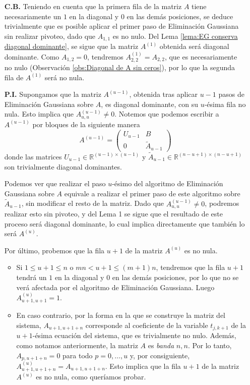             \begin{itemize}
                \item[\textbf{C.B.}] Teniendo en cuenta que la primera fila de la matriz $A$ tiene necesariamente un $1$ en la diagonal y $0$ en las demás posiciones, se deduce trivialmente que es posible aplicar el primer paso de Eliminación Gaussiana sin realizar pivoteo, dado que $A_{1, 1}$ es no nulo. Del Lema \ref{lema:EG conserva diagonal dominante}, se sigue que la matriz $A^{(1)}$ obtenida será diagonal dominante. Como $A_{1, 2} = 0$, tendremos $A^{(1)}_{2,2} = A_{2,2}$, que es necesariamente no nulo (Observación \ref{obs:Diagonal de A sin ceros}), por lo que la segunda fila de $A^{(1)}$ será no nula.
                        
                \item[\textbf{P.I.}] Supongamos que la matriz $A^{(u - 1)}$, obtenida tras aplicar $u - 1$ pasos de Eliminación Gaussiana sobre $A$, es diagonal dominante, con su $u$-ésima fila no nula. Esto implica que $A^{(u - 1)}_{u,u} \neq 0$. Notemos que podemos escribir a $A^{(u - 1)}$ por bloques de la siguiente manera
                    \[ A^{(u - 1)} = \left( \begin{matrix} U_{u - 1} & B \\ 0 & \widetilde{A}_{u - 1} \end{matrix} \right) \]
                donde las matrices $U_{u - 1} \in \mathbb{R}^{(u-1)\times(u-1)}$ y $\widetilde{A}_{u - 1} \in \mathbb{R}^{(n-u+1)\times(n-u+1)}$ son trivialmente diagonal dominantes.

                Podemos ver que realizar el paso $u$-ésimo del algoritmo de Eliminación Gaussiana sobre $A$ equivale a realizar el primer paso de este algoritmo sobre $\widetilde{A}_{u - 1}$, sin modificar el resto de la matriz. Dado que $A^{(u - 1)}_{u,u} \neq 0$, podremos realizar esto sin pivoteo, y del Lema 1 se sigue que el resultado de este proceso será diagonal dominante, lo cual implica directamente que también lo será $A^{(u)}$.

                Por último, probemos que la fila $u + 1$ de la matriz $A^{(u)}$ es no nula.
                \begin{itemize}
                    \item Si $1 \leq u + 1 \leq n$ o $mn < u + 1 \leq (m+1)n$, tendremos que la fila $u + 1$ tendrá un $1$ en la diagonal y $0$ en las demás posiciones, por lo que no se verá afectada por el algoritmo de Eliminación Gaussiana. Luego $A^{(u)}_{u+1,u+1} = 1$.
                    \item En caso contrario, por la forma en la que se construye la matriz del sistema, $A_{u+1,u+1+n}$ corresponde al coeficiente de la variable $t_{j,k+1}$ de la $u + 1$-ésima ecuación del sistema, que es trivialmente no nulo. Además, como notamos anteriormente, la matriz $A$ es \emph{banda} $n, n$. Por lo tanto, $A_{p,u+1+n} = 0$ para todo $p = 0, \dots, u$ y, por consiguiente, $A^{(u)}_{u+1,u+1+n} = A_{u+1,u+1+n}$. Esto implica que la fila $u + 1$ de la matriz $A^{(u)}$ es no nula, como queríamos probar. \qedhere
                \end{itemize}
            \end{itemize}

